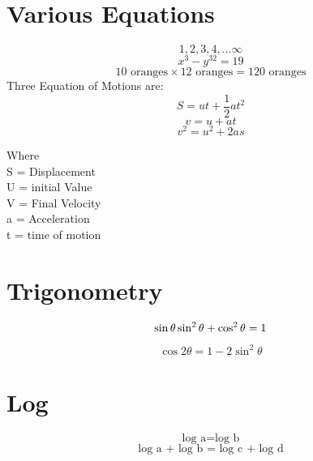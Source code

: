 \documentclass{article}
\begin{document}
\section{Various Equations}
\begin{equation}
 1,2,3,4,...\infty 
\end{equation}
\begin{equation}
     x^{3} - y^{32} = 19
\end{equation}
\begin{equation}
    \mbox{10 oranges} \times \mbox{12 oranges} = \mbox{120 oranges}
\end{equation}
Three Equation of Motions are:
\begin{equation}
 S = ut + \frac{1}{2}at^{2}   
\end{equation}
\begin{equation}
v = u + at    
\end{equation}
\begin{equation}
  v^{2} = u^{2} + 2as  
\end{equation}

Where \\
S = Displacement \\
U = initial Value \\
V = Final Velocity \\
a = Acceleration \\
t = time of motion \\



\section{Trigonometry}
\begin{equation}

\sin\theta \\
\sin^{2}\theta + \cos^{2}\theta = 1
 
\end{equation}

\begin{equation}
\cos2\theta = 1 - 2\sin^{2}\theta
\end{equation}



\section{Log}
\begin{equation}
    \mbox{log a} = \mbox{log b}
\end{equation}
\begin{equation}
    \mbox{log a + log b = log c + log d}
\end{equation}
\end{document}
